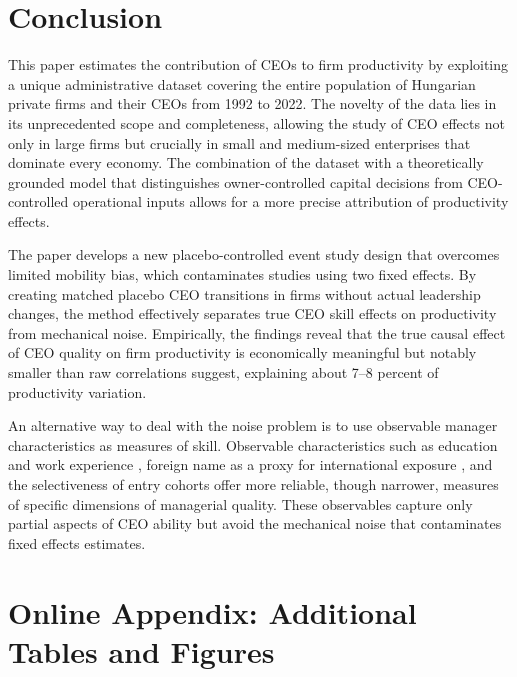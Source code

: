 \documentclass[11pt,a4paper]{article}
\begin{document}
\section{Conclusion}

This paper estimates the contribution of CEOs to firm productivity by exploiting a unique administrative dataset covering the entire population of Hungarian private firms and their CEOs from 1992 to 2022. The novelty of the data lies in its unprecedented scope and completeness, allowing the study of CEO effects not only in large firms but crucially in small and medium-sized enterprises that dominate every economy. The combination of the dataset with a theoretically grounded model that distinguishes owner-controlled capital decisions from CEO-controlled operational inputs allows for a more precise attribution of productivity effects. 

The paper develops a new placebo-controlled event study design that overcomes limited mobility bias, which contaminates studies using two fixed effects.  By creating matched placebo CEO transitions in firms without actual leadership changes, the method effectively separates true CEO skill effects on productivity from mechanical noise. Empirically, the findings reveal that the true causal effect of CEO quality on firm productivity is economically meaningful but notably smaller than raw correlations suggest, explaining about 7–8 percent of productivity variation. 

An alternative way to deal with the noise problem is to use observable manager characteristics as measures of skill. Observable characteristics such as education and work experience \citep{DePirro2025}, foreign name as a proxy for international exposure \citep{Koren2023expat}, and the selectiveness of entry cohorts \citep{koren2024managers} offer more reliable, though narrower, measures of specific dimensions of managerial quality. These observables capture only partial aspects of CEO ability but avoid the mechanical noise that contaminates fixed effects estimates.

\clearpage



\clearpage
\appendix
\section{Online Appendix: Additional Tables and Figures}
\renewcommand{\thefigure}{A\arabic{figure}}
\renewcommand{\thetable}{A\arabic{table}}
\setcounter{figure}{0}
\setcounter{table}{0}






%
\end{document}
